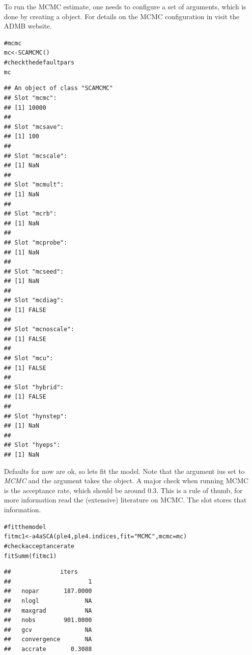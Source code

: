 \documentclass[a4paper,english,10pt]{article}\usepackage[]{graphicx}\usepackage[]{color}
\makeatletter
\newcommand{\hlstr}[1]{\textcolor[rgb]{0.063,0.58,0.627}{#1}}%
\newcommand{\hlcom}[1]{\textcolor[rgb]{0.588,0.588,0.588}{#1}}%
\newcommand{\hlstd}[1]{\textcolor[rgb]{0.196,0.196,0.196}{#1}}%
\newcommand{\hlkwb}[1]{\textcolor[rgb]{0.627,0,0.314}{#1}}%
\newcommand{\hlkwc}[1]{\textcolor[rgb]{0,0.631,0.314}{#1}}%
\newcommand{\hlkwd}[1]{\textcolor[rgb]{0.78,0.227,0.412}{#1}}%
\newenvironment{kframe}{%
 \def\at@end@of@kframe{}%
 \ifinner\ifhmode%
  \def\at@end@of@kframe{\end{minipage}}%
  \begin{minipage}{\columnwidth}%
 \fi\fi%
 \def\FrameCommand##1{\hskip\@totalleftmargin \hskip-\fboxsep
 \colorbox{shadecolor}{##1}\hskip-\fboxsep
     \hskip-\linewidth \hskip-\@totalleftmargin \hskip\columnwidth}%
 \MakeFramed {\advance\hsize-\width
   \@totalleftmargin\z@ \linewidth\hsize
   \@setminipage}}%
 {\par\unskip\endMakeFramed%
 \at@end@of@kframe}
\newenvironment{knitrout}{}{} %
\makeatother
\begin{document}
To run the MCMC estimate, one needs to configure a set of arguments, which is done by creating a  object. For details on the MCMC configuration in  visit the ADMB website.

\begin{knitrout}
\color{fgcolor}\begin{kframe}
\begin{alltt}
\hlcom{# mcmc}
\hlstd{mc} \hlkwb{<-} \hlkwd{SCAMCMC}\hlstd{()}
\hlcom{# check the default pars}
\hlstd{mc}
\end{alltt}
\begin{verbatim}
## An object of class "SCAMCMC"
## Slot "mcmc":
## [1] 10000
## 
## Slot "mcsave":
## [1] 100
## 
## Slot "mcscale":
## [1] NaN
## 
## Slot "mcmult":
## [1] NaN
## 
## Slot "mcrb":
## [1] NaN
## 
## Slot "mcprobe":
## [1] NaN
## 
## Slot "mcseed":
## [1] NaN
## 
## Slot "mcdiag":
## [1] FALSE
## 
## Slot "mcnoscale":
## [1] FALSE
## 
## Slot "mcu":
## [1] FALSE
## 
## Slot "hybrid":
## [1] FALSE
## 
## Slot "hynstep":
## [1] NaN
## 
## Slot "hyeps":
## [1] NaN
\end{verbatim}
\end{kframe}
\end{knitrout}

Defaults for now are ok, so lets fit the model. Note that the argument  ius set to \emph{MCMC} and the argument  takes the  object. A major check when running MCMC is the acceptance rate, which should be around 0.3. This is a rule of thumb, for more information read the (extensive) literature on MCMC. The slot  stores that information.

\begin{knitrout}
\color{fgcolor}\begin{kframe}
\begin{alltt}
\hlcom{# fit the model}
\hlstd{fitmc1} \hlkwb{<-} \hlkwd{a4aSCA}\hlstd{(ple4, ple4.indices,} \hlkwc{fit} \hlstd{=} \hlstr{"MCMC"}\hlstd{,} \hlkwc{mcmc} \hlstd{= mc)}
\hlcom{# check acceptance rate}
\hlkwd{fitSumm}\hlstd{(fitmc1)}
\end{alltt}
\begin{verbatim}
##              iters
##                      1
##   nopar       187.0000
##   nlogl             NA
##   maxgrad           NA
##   nobs        901.0000
##   gcv               NA
##   convergence       NA
##   accrate       0.3088
\end{verbatim}
\end{kframe}
\end{knitrout}
\end{document}
